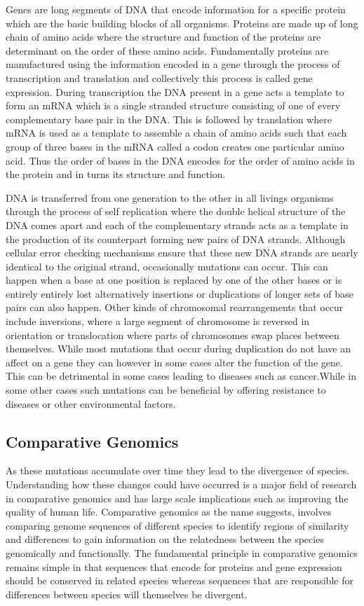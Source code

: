 Genes are long segments of DNA that encode information for a specific protein which are the basic building blocks of all organisms. Proteins are made up of long chain of amino acids where the structure and function of the proteins are determinant on the order of these amino acids. Fundamentally proteins are manufactured using the information encoded in a gene through the process of transcription and translation and collectively this process is called gene expression. During transcription the DNA present in a gene acts a template to form an mRNA which is a single stranded structure consisting of one of every complementary base pair in the DNA. This is followed by translation where mRNA is used as a template to assemble a chain of amino acids such that each group of three bases in the mRNA called a codon creates one particular amino acid. Thus the order of bases in the DNA encodes for the order of amino acids in the protein and in turns its structure and function\cite{clancy2008translation}.

DNA is transferred from one generation to the other in all livings organisms through the process of self replication where the double helical structure of the DNA comes apart and each of the complementary strands acts as a template in the production of its counterpart \cite{pray2008semi} forming new pairs of DNA strands. Although cellular error checking mechanisms ensure that these new DNA strands are nearly identical to the original strand, occasionally mutations can occur. This can happen when a base at one position is replaced by one of the other bases or is entirely entirely lost alternatively insertions or duplications of longer sets of base pairs can also happen. Other kinds of chromosomal rearrangements that occur include inversions, where a large segment of chromosome is reversed in orientation or translocation where parts of chromosomes swap places between themselves\cite{hartwell2008genetics}. While most mutations that occur during duplication do not have an affect on a gene they can however in some cases alter the function of the gene. This can be detrimental in some cases leading to diseases such as cancer.While in some other cases such mutations can be beneficial by offering resistance to diseases or other environmental factors. 

\subsection{Comparative Genomics}
As these mutations accumulate over time they lead to the divergence of species. Understanding how these changes could have occurred is a major field of research in comparative genomics and has large scale implications such as improving the quality of human life\cite{collins2003vision}. Comparative genomics as the name suggests, involves comparing genome sequences of different species to identify regions of similarity and differences to gain information on the relatedness between the species genomically and functionally. The fundamental principle in comparative genomics remains simple in that sequences that encode for proteins and gene expression should be conserved in related species whereas sequences that are responsible for differences between species will themselves be divergent.

